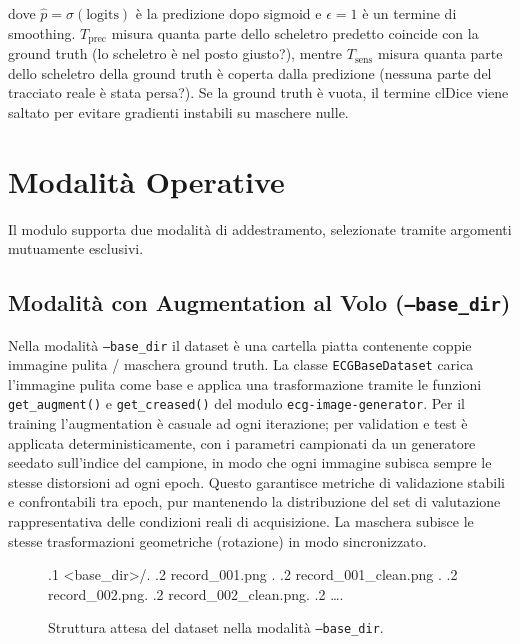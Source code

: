 dove $\hat{p} = \sigma(\text{logits})$ è la predizione dopo sigmoid e $\epsilon = 1$ è un termine di smoothing. $T_{\text{prec}}$ misura quanta parte dello scheletro predetto coincide con la ground truth (lo scheletro è nel posto giusto?), mentre $T_{\text{sens}}$ misura quanta parte dello scheletro della ground truth è coperta dalla predizione (nessuna parte del tracciato reale è stata persa?). Se la ground truth è vuota, il termine clDice viene saltato per evitare gradienti instabili su maschere nulle.

\section{Modalità Operative}

Il modulo supporta due modalità di addestramento, selezionate tramite argomenti mutuamente esclusivi.

\subsection{Modalità con Augmentation al Volo (\texttt{--base\_dir})}

Nella modalità \texttt{--base\_dir} il dataset è una cartella piatta contenente coppie immagine pulita / maschera ground truth. La classe \texttt{ECGBaseDataset} carica l'immagine pulita come base e applica una trasformazione tramite le funzioni \texttt{get\_augment()} e \texttt{get\_creased()} del modulo \texttt{ecg-image-generator}. Per il training l'augmentation è casuale ad ogni iterazione; per validation e test è applicata deterministicamente, con i parametri campionati da un generatore seedato sull'indice del campione, in modo che ogni immagine subisca sempre le stesse distorsioni ad ogni epoch. Questo garantisce metriche di validazione stabili e confrontabili tra epoch, pur mantenendo la distribuzione del set di valutazione rappresentativa delle condizioni reali di acquisizione. La maschera subisce le stesse trasformazioni geometriche (rotazione) in modo sincronizzato.

\begin{figure}[H]
\raggedright
\begin{dirtree}{%
.1 <base\_dir>/.
.2 record\_001.png .
.2 record\_001\_clean.png .
.2 record\_002.png.
.2 record\_002\_clean.png.
.2 \ldots.
}
\caption{Struttura attesa del dataset nella modalità \texttt{--base\_dir}.}
\label{fig:extractor_basedir}
\end{dirtree}
\end{figure}

